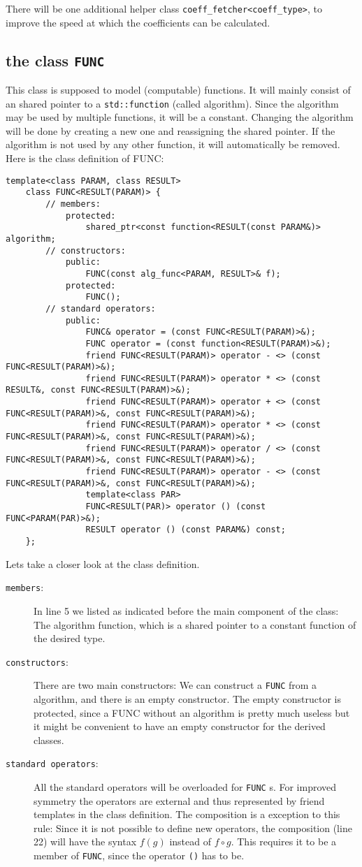 \documentclass{article}
\newcommand{\code}[1]{\texttt{#1}\xspace}
\newcommand{\func}[1]{\texttt{#1}\xspace}
\begin{document}
There will be one additional helper class \func{coeff\_fetcher<coeff\_type>}, to improve the speed at which the coefficients can be calculated.

\subsection{the class \texttt{FUNC}}

This class is supposed to model (computable) functions. It will mainly consist of an shared pointer to a \texttt{std::function} (called algorithm). Since the algorithm may be used by multiple functions, it will be a constant. Changing the algorithm will be done by creating a new one and reassigning the shared pointer. If the algorithm is not used by any other function, it will automatically be removed. Here is the class definition of FUNC:
\begin{lstlisting}
template<class PARAM, class RESULT>
	class FUNC<RESULT(PARAM)> {
		// members:
			protected:
				shared_ptr<const function<RESULT(const PARAM&)> algorithm;
		// constructors:
			public:
				FUNC(const alg_func<PARAM, RESULT>& f);
			protected:
				FUNC();
		// standard operators:
			public:
				FUNC& operator = (const FUNC<RESULT(PARAM)>&);
				FUNC operator = (const function<RESULT(PARAM)>&);
				friend FUNC<RESULT(PARAM)> operator - <> (const FUNC<RESULT(PARAM)>&);
				friend FUNC<RESULT(PARAM)> operator * <> (const RESULT&, const FUNC<RESULT(PARAM)>&);
				friend FUNC<RESULT(PARAM)> operator + <> (const FUNC<RESULT(PARAM)>&, const FUNC<RESULT(PARAM)>&);
				friend FUNC<RESULT(PARAM)> operator * <> (const FUNC<RESULT(PARAM)>&, const FUNC<RESULT(PARAM)>&);
				friend FUNC<RESULT(PARAM)> operator / <> (const FUNC<RESULT(PARAM)>&, const FUNC<RESULT(PARAM)>&);
				friend FUNC<RESULT(PARAM)> operator - <> (const FUNC<RESULT(PARAM)>&, const FUNC<RESULT(PARAM)>&);
				template<class PAR>
				FUNC<RESULT(PAR)> operator () (const FUNC<PARAM(PAR)>&);
				RESULT operator () (const PARAM&) const;
	};
\end{lstlisting}
Lets take a closer look at the class definition.
\begin{description}
\item[\code{members}:] In line 5 we listed as indicated before the main component of the class: The algorithm function, which is a shared pointer to a constant function of the desired type.
\item[\code{constructors}:] There are two main constructors: We can construct a \func{FUNC} from a algorithm, and there is an empty constructor. The empty constructor is protected, since a FUNC without an algorithm is pretty much useless but it might be convenient to have an empty constructor for the derived classes.
\item[\code{standard operators}:] All the standard operators will be overloaded for \func{FUNC}s. For improved symmetry the operators are external and thus represented by friend templates in the class definition. The composition is a exception to this rule: Since it is not possible to define new operators, the composition (line 22) will have the syntax $f(g)$ instead of $f\circ g$. This requires it to be a member of \func{FUNC}, since the operator \code{()} has to be.
\end{description}
\end{document}
